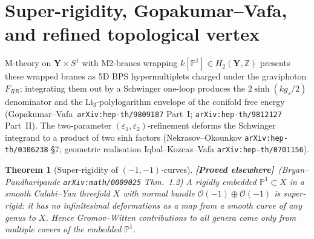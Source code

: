 \documentclass[11pt]{amsart}
\newtheorem{theorem}{Theorem}[section]
\theoremstyle{definition}
\providecommand{\bY}{\mathbf{Y}}
\providecommand{\cO}{\mathcal{O}}
\providecommand{\bZ}{\mathbb{Z}}
\providecommand{\bP}{\mathbb{P}}
\providecommand{\ClaimStatusProvedElsewhere}{\textbf{\textsf{[Proved elsewhere]}}}
\begin{document}
\section{Super-rigidity, Gopakumar--Vafa, and refined topological vertex}

M-theory on $\bY \times S^{1}$ with M2-branes wrapping $k[\bP^{1}] \in
H_{2}(\bY,\bZ)$ presents these wrapped branes as 5D BPS hypermultiplets
charged under the graviphoton $F_{RR}$; integrating them out by a
Schwinger one-loop produces the $2\sinh(k g_{s}/2)$ denominator and the
$\mathrm{Li}_{3}$-polylogarithm envelope of the conifold free energy
(Gopakumar--Vafa~\texttt{arXiv:hep-th/9809187} Part~I;
\texttt{arXiv:hep-th/9812127} Part~II). The two-parameter
$(\varepsilon_{1}, \varepsilon_{2})$-refinement deforms the Schwinger
integrand to a product of two sinh factors (Nekrasov--Okounkov
\texttt{arXiv:hep-th/0306238} §7; geometric realisation
Iqbal--Kozcaz--Vafa \texttt{arXiv:hep-th/0701156}).

\begin{theorem}[Super-rigidity of $(-1,-1)$-curves]
\label{thm:super-rigidity}
\ClaimStatusProvedElsewhere\ \emph{(Bryan--Pandharipande
\texttt{arXiv:math/0009025} Thm.~1.2)}
A rigidly embedded $\bP^1 \subset X$ in a smooth Calabi--Yau threefold
$X$ with normal bundle $\cO(-1) \oplus \cO(-1)$ is
\emph{super-rigid}: it has no infinitesimal deformations as a map from
a smooth curve of any genus to $X$. Hence Gromov--Witten contributions
to all genera come only from multiple covers of the embedded $\bP^1$.
\end{theorem}
\end{document}
